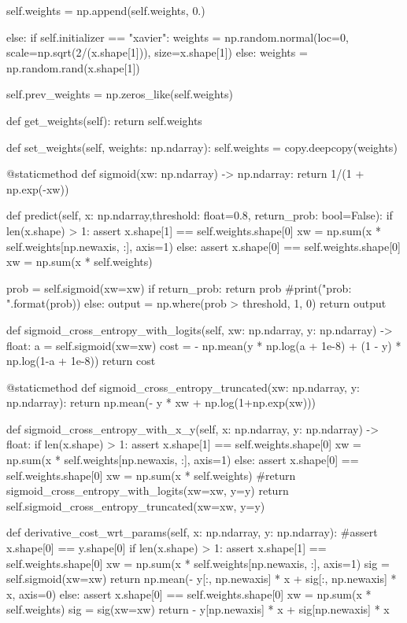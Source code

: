\documentclass[14pt, a4paper]{article}
\theoremstyle{sltheorem}
\theoremstyle{soltheorem}
\begin{document}
\begin{python}
            self.weights = np.append(self.weights, 0.)

        else:
            if self.initializer == "xavier":
                weights = np.random.normal(loc=0, scale=np.sqrt(2/(x.shape[1])), size=x.shape[1])
            else:
                weights = np.random.rand(x.shape[1])

        self.prev_weights = np.zeros_like(self.weights)
        
    def get_weights(self):
        return self.weights
    
    def set_weights(self, weights: np.ndarray):
        self.weights = copy.deepcopy(weights)
    
    
    @staticmethod
    def sigmoid(xw: np.ndarray) -> np.ndarray:
        return 1/(1 + np.exp(-xw))
    
    
    def predict(self, x: np.ndarray,threshold: float=0.8, return_prob: bool=False):
        if len(x.shape) > 1:
            assert x.shape[1] == self.weights.shape[0]
            xw = np.sum(x * self.weights[np.newaxis, :], axis=1)
        else:
            assert x.shape[0] == self.weights.shape[0]
            xw = np.sum(x * self.weights)

        prob = self.sigmoid(xw=xw)
        if return_prob:
            return prob
        #print("prob: {}".format(prob))
        else:
            output = np.where(prob > threshold, 1, 0)
            return output
        
    
    def sigmoid_cross_entropy_with_logits(self, xw: np.ndarray, y: np.ndarray) -> float:
        a = self.sigmoid(xw=xw)
        cost = - np.mean(y * np.log(a + 1e-8) + (1 - y) * np.log(1-a + 1e-8))
        return cost
    
    
    @staticmethod
    def sigmoid_cross_entropy_truncated(xw: np.ndarray, y: np.ndarray):
        return np.mean(- y * xw + np.log(1+np.exp(xw)))
    
    
    def sigmoid_cross_entropy_with_x_y(self, x: np.ndarray, y: np.ndarray) -> float:
        if len(x.shape) > 1:
            assert x.shape[1] == self.weights.shape[0]
            xw = np.sum(x * self.weights[np.newaxis, :], axis=1)
        else:
            assert x.shape[0] == self.weights.shape[0]
            xw = np.sum(x * self.weights)
        #return sigmoid_cross_entropy_with_logits(xw=xw, y=y)
        return self.sigmoid_cross_entropy_truncated(xw=xw, y=y)
    
    
    def derivative_cost_wrt_params(self, x: np.ndarray, y: np.ndarray):
        #assert x.shape[0] == y.shape[0]
        if len(x.shape) > 1:
            assert x.shape[1] == self.weights.shape[0]
            xw = np.sum(x * self.weights[np.newaxis, :], axis=1)
            sig = self.sigmoid(xw=xw)
            return np.mean(- y[:, np.newaxis] * x + sig[:, np.newaxis] * x, axis=0)
        else:
            assert x.shape[0] == self.weights.shape[0]
            xw = np.sum(x * self.weights)
            sig = sig(xw=xw)
            return - y[np.newaxis] * x + sig[np.newaxis] * x
        

\end{python}
\end{document}
